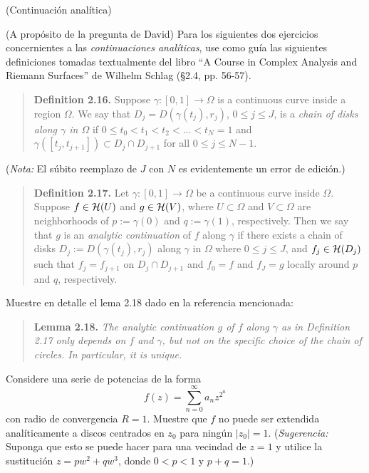 \begin{exercise}
(Continuación analítica)

\vspace{1mm}

\noindent (A propósito de la pregunta de David) Para los siguientes dos ejercicios concernientes a las \textit{continuaciones analíticas}, use como guía las siguientes definiciones tomadas textualmente del libro ``A Course in Complex Analysis and Riemann Surfaces'' de Wilhelm Schlag (\S 2.4, pp. 56-57).

\begin{quote}
\textbf{Definition 2.16.} Suppose $\gamma : [0,1] \to \Omega$ is a continuous curve inside a region $\Omega$. We say that $D_j = D(\gamma(t_j), r_j)$, $0 \le j \le J$, is a \textit{chain of disks along $\gamma$ in $\Omega$} if $0 \le t_0 < t_1 < t_2 < \dots < t_N  = 1$ and $\gamma([t_j, t_{j+1}]) \subset D_j \cap D_{j+1}$ for all $0 \le j \le N-1$.
\end{quote}
\noindent (\textit{Nota:} El súbito reemplazo de $J$ con $N$ es evidentemente un error de edición.)

\begin{quote}
\textbf{Definition 2.17.} Let $\gamma : [0,1] \to \Omega$ be a continuous curve inside $\Omega$. Suppose $f \in \mathcal H(U)$ and $g \in \mathcal H(V)$, where $U \subset \Omega$ and $V \subset \Omega$ are neighborhoods of $p := \gamma(0)$ and $q := \gamma(1)$, respectively. Then we say that $g$ is an \textit{analytic continuation} of $f$ along $\gamma$ if there exists a chain of disks $D_j := D(\gamma(t_j), r_j)$ along $\gamma$ in $\Omega$ where $0 \le j \le J$, and $f_j \in \mathcal H(D_j)$ such that $f_j = f_{j+1}$ on $D_j \cap D_{j+1}$ and $f_0 = f$ and $f_J = g$ locally around $p$ and $q$, respectively.
\end{quote}

\noindent Muestre en detalle el lema 2.18 dado en la referencia mencionada:
\begin{quote}
    \textbf{Lemma 2.18.} \textit{The analytic continuation $g$ of $f$ along $\gamma$ as in Definition 2.17 only depends on $f$ and $\gamma$, but not on the specific choice of the chain of circles. In particular, it is unique.}
\end{quote}

\noindent Considere una serie de potencias de la forma
$$f(z) = \sum_{n=0}^\infty a_n z^{2^n}$$
con radio de convergencia $R = 1$. Muestre que $f$ no puede ser extendida analíticamente a discos centrados en $z_0$ para ningún $|z_0| = 1$. (\textit{Sugerencia:} Suponga que esto se puede hacer para una vecindad de $z = 1$ y utilice la sustitución $z = pw^2 + qw^3$, donde $0 < p < 1$ y $p + q = 1$.)
\end{exercise}

